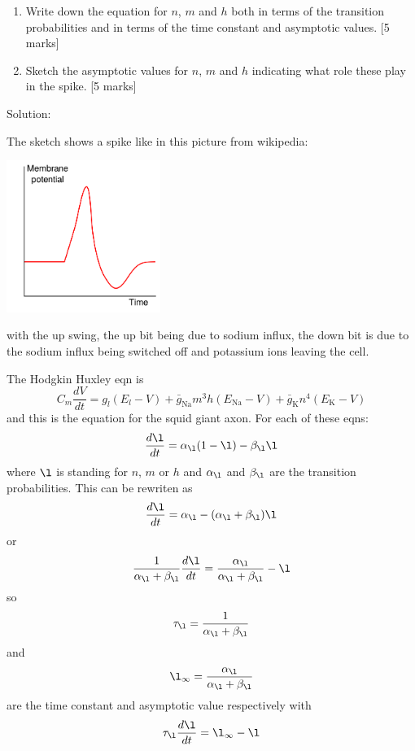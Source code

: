 \documentclass[a4paper,12pt]{article}
\newif\ifsoln
\begin{document}
\begin{enumerate}
\begin{enumerate}
\item Write down the equation for $n$, $m$ and $h$ both in terms of
  the transition probabilities and in terms of the time constant and
  asymptotic values. [5 marks]

\item Sketch the asymptotic values for $n$, $m$ and $h$ indicating
  what role these play in the spike. [5 marks]

\end{enumerate}

\ifsoln Solution:  

The sketch shows a spike like in this picture from wikipedia:
\begin{center}
\includegraphics[width=5cm]{Action_potential_basic_shape.png}
\end{center}
with the up swing, the up bit being due to sodium influx, the down bit is due to the sodium influx being switched off and potassium ions leaving the cell.

The Hodgkin Huxley eqn is
\begin{equation}
C_m\frac{dV}{dt}=g_l(E_l-V)+\bar{g}_\text{Na}m^3h(E_\text{Na}-V)+\bar{g}_\text{K}n^4(E_\text{K}-V)
\end{equation}
and this is the equation for the squid giant axon. For each of these eqns:
\begin{equation}
\frac{d\l}{dt} =\alpha_{\l} (1-\l)-\beta_{\l} \l
\end{equation}
where $\l$ is standing for $n$, $m$ or $h$ and $\alpha_{\l}$ and
$\beta_{\l}$ are the transition probabilities. This can be rewriten as
\begin{equation}
\frac{d\l}{dt} =\alpha_{\l}-(\alpha_{\l}+\beta_{\l}) \l
\end{equation}
or
\begin{equation}
\frac{1}{\alpha_{\l}+\beta_{\l}}\frac{d\l}{dt} =\frac{\alpha_{\l}}{\alpha_{\l}+\beta_{\l}}- \l
\end{equation}
so 
\begin{equation}
\tau_{\l}=\frac{1}{\alpha_{\l}+\beta_{\l}}
\end{equation}
and
\begin{equation}
\l_\infty=\frac{\alpha_{\l}}{\alpha_{\l}+\beta_{\l}}
\end{equation}
are the time constant and asymptotic value respectively with
\begin{equation}
\tau_{\l}\frac{d\l}{dt} =\l_\infty- \l
\end{equation}



\end{enumerate}
\end{document}
